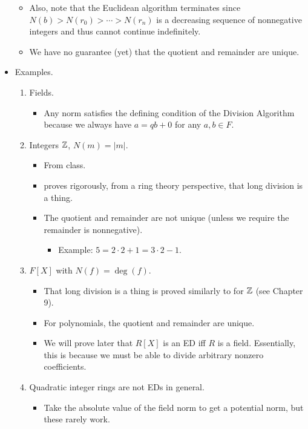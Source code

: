 \documentclass[../notes.tex]{subfiles}
\begin{document}
\begin{itemize}
\begin{itemize}
        \item Also, note that the Euclidean algorithm terminates since $N(b)>N(r_0)>\cdots>N(r_n)$ is a decreasing sequence of nonnegative integers and thus cannot continue indefinitely.
        \item We have no guarantee (yet) that the quotient and remainder are unique.
    \end{itemize}
    \item Examples.
    \begin{enumerate}
        \item Fields.
        \begin{itemize}
            \item Any norm satisfies the defining condition of the Division Algorithm because we always have $a=qb+0$ for any $a,b\in F$.
        \end{itemize}
        \item Integers $\mathbb{Z}$, $N(m)=|m|$.
        \begin{itemize}
            \item From class.
            \item \textcite{bib:DummitFoote} proves rigorously, from a ring theory perspective, that long division is a thing.
            \item The quotient and remainder are not unique (unless we require the remainder is nonnegative).
            \begin{itemize}
                \item Example: $5=2\cdot 2+1=3\cdot 2-1$.
            \end{itemize}
        \end{itemize}
        \item $F[X]$ with $N(f)=\deg(f)$.
        \begin{itemize}
            \item That long division is a thing is proved similarly to for $\mathbb{Z}$ (see Chapter 9).
            \item For polynomials, the quotient and remainder are unique.
            \item We will prove later that $R[X]$ is an ED iff $R$ is a field. Essentially, this is because we must be able to divide arbitrary nonzero coefficients.
        \end{itemize}
        \item Quadratic integer rings are not EDs in general.
        \begin{itemize}
            \item Take the absolute value of the field norm to get a potential norm, but these rarely work.

\end{itemize}
\end{enumerate}
\end{itemize}
\end{document}
